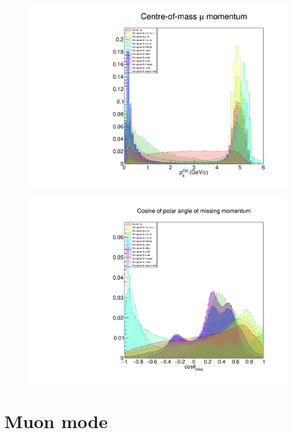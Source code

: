 \documentclass[12pt]{thesis}  %
\begin{document}
\begin{figure}[h]
\centering
\begin{minipage}{.5\textwidth}
  \centering
  \includegraphics[width=\linewidth]{images/tauMG-muCM_P.pdf}
  \label{fig:test1}
\end{minipage}%
\begin{minipage}{.5\textwidth}
  \centering
  \includegraphics[width=\linewidth]{images/tauMG-missingCosTheta.pdf}
  \label{fig:test2}
\end{minipage}
\end{figure}

\section{Muon mode}
\end{document}
